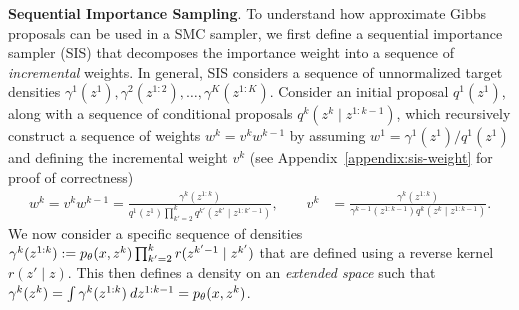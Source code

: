 \documentclass[anonymous=false, %
               format=acmsmall, %
               review=true, %
               screen=true, %
               nonacm=true]{acmart}
\theoremstyle{definition}
\begin{document}
\textbf{Sequential Importance Sampling}. To understand how approximate Gibbs proposals can be used in a SMC sampler, we first define a sequential importance sampler (SIS) that decomposes the importance weight into a sequence of \emph{incremental} weights. In general, SIS considers a sequence of unnormalized target densities $\gamma^1(z^1), \gamma^2(z^{1:2}), \dots, \gamma^K(z^{1:K})$. Consider an initial proposal $q^1(z^1)$, along with a sequence of conditional proposals $q^k(z^k \mid z^{1:k-1})$, which recursively construct a sequence of weights $w^k = v^k w^{k-1}$ by assuming $w^1 = \gamma^1(z^1) / q^1(z^1)$ and defining the incremental weight $v^k$ (see Appendix~\ref{appendix:sis-weight} for proof of correctness)
\begin{align*}
    w^k
    = 
    v^k w^{k-1}
    =
    \frac{\gamma^k(z^{1:k})}
         {q^1(z^1) \prod_{k'=2}^k q^{k'}(z^{k'} \mid z^{1:k'-1})},
    \qquad
    v^k 
    &=
    \frac{\gamma^k(z^{1:k})}{\gamma^{k-1}(z^{1:k-1}) q^k(z^k \mid z^{1:k-1})}.
\end{align*}
We now consider a specific sequence of densities $\gamma^k(z^{1:k}):= p_\theta(x,z^k) \prod_{k'=2}^{k} r(z^{k'-1} \mid z^{k'})$ that are defined using a reverse kernel $r(z' \mid z)$. This then defines a density on an \emph{extended space} such that $\gamma^k(z^k) = \int \gamma^k(z^{1:k}) \: dz^{1:k-1} = p_\theta(x, z^k)$.
\end{document}
